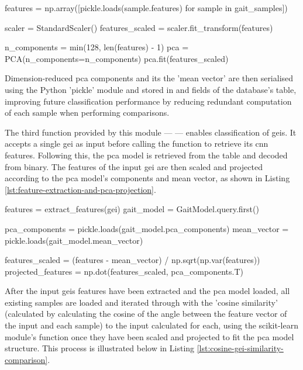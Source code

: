 \begin{code}
features = np.array([pickle.loads(sample.features) for sample in gait_samples])

scaler = StandardScaler()
features_scaled = scaler.fit_transform(features)

n_components = min(128, len(features) - 1)
pca = PCA(n_components=n_components)
pca.fit(features_scaled)
\end{code}
\label{lst:pca-model-training} \vspace{10pt}

Dimension-reduced \ac{pca} components and its the 'mean vector' are then serialised using the Python 'pickle' module and stored in  and  fields of the database's  table, improving future classification performance by reducing redundant computation of each sample when performing comparisons.

The third function provided by this module ---  --- enables classification of \ac{gei}s.
It accepts a single \ac{gei} as input before calling the  function to retrieve its \ac{cnn} features.
Following this, the \ac{pca} model is retrieved from the  table and decoded from binary.
The features of the input \ac{gei} are then scaled and projected according to the \ac{pca} model's components and mean vector, as shown in Listing \ref{lst:feature-extraction-and-pca-projection}. 

\begin{code}
features = extract_features(gei)
gait_model = GaitModel.query.first()

pca_components = pickle.loads(gait_model.pca_components)
mean_vector = pickle.loads(gait_model.mean_vector)

features_scaled = (features - mean_vector) / np.sqrt(np.var(features))
projected_features = np.dot(features_scaled, pca_components.T)
\end{code}
\label{lst:feature-extraction-and-pca-projection}
\vspace{10pt}

After the input \acp{gei} features have been extracted and the \ac{pca} model loaded, all existing samples are loaded and iterated through with the 'cosine similarity' (calculated by calculating the cosine of the angle between the feature vector of the input and each sample) to the input calculated for each, using the scikit-learn module's  function once they have been scaled and projected to fit the \ac{pca} model structure.
This process is illustrated below in Listing \ref{lst:cosine-gei-similarity-comparison}. 

